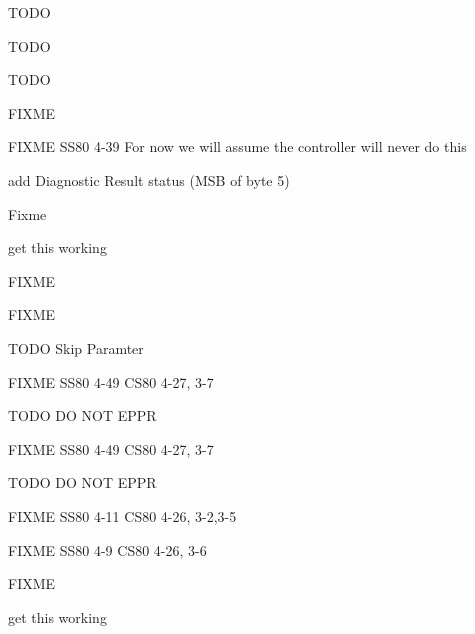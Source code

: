 \begin{DoxyRefList}
T\+O\+DO 

T\+O\+DO 

T\+O\+DO  
\item[\label{todo__todo000010}%
\hypertarget{todo__todo000010}{}%
Global \hyperlink{ss80_8h_a46587aecd8aff545fb96ef5b308f28ff}{S\+S80\+\_\+init} (void)]F\+I\+X\+ME  
\item[\label{todo__todo000011}%
\hypertarget{todo__todo000011}{}%
Global \hyperlink{ss80_8h_acad6de863f4566b55cb8860eb1ffd09c}{S\+S80\+\_\+locate\+\_\+and\+\_\+read} (void)]F\+I\+X\+ME S\+S80 4-\/39 For now we will assume the controller will never do this  
\item[\label{todo__todo000012}%
\hypertarget{todo__todo000012}{}%
Global \hyperlink{ss80_8h_ac4c1287b3b8b6a51f5b79522c62d4cea}{S\+S80\+\_\+send\+\_\+status} (void)]add Diagnostic Result status (M\+SB of byte 5) 

Fixme  
\item[\label{todo__todo000009}%
\hypertarget{todo__todo000009}{}%
Global \hyperlink{ss80_8h_af50a313d8234d38511925a0ca5a9a8a3}{S\+S80\+\_\+\+Test} (void)]get this working  
\item[\label{todo__todo000032}%
\hypertarget{todo__todo000032}{}%
Global \hyperlink{ss80_8h_a00d10ca5d1cb70d035927df06e90d36c}{S\+S80\+\_\+\+Transparent\+\_\+\+State} (void)]F\+I\+X\+ME 

F\+I\+X\+ME 

T\+O\+DO Skip Paramter 

F\+I\+X\+ME S\+S80 4-\/49 C\+S80 4-\/27, 3-\/7 

T\+O\+DO DO N\+OT E\+P\+PR 

F\+I\+X\+ME S\+S80 4-\/49 C\+S80 4-\/27, 3-\/7 

T\+O\+DO DO N\+OT E\+P\+PR 

F\+I\+X\+ME S\+S80 4-\/11 C\+S80 4-\/26, 3-\/2,3-\/5 

F\+I\+X\+ME S\+S80 4-\/9 C\+S80 4-\/26, 3-\/6  
\item[\label{todo__todo000045}%
\hypertarget{todo__todo000045}{}%
Global \hyperlink{ss80_8h_ac8a4c5dcd550e896c1e7cec68d2f70e5}{S\+S80\+\_\+\+Universal\+\_\+\+Device\+\_\+\+Clear} (void)]F\+I\+X\+ME  
\item[\label{todo__todo000008}%
\hypertarget{todo__todo000008}{}%
Global \hyperlink{ss80_8c_a239f4cd0f1360dbfd90fa043d1323e67}{TD} \mbox{[}\mbox{]}]get this working 
\end{DoxyRefList}